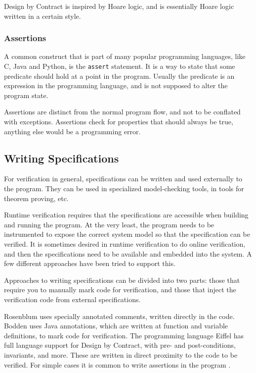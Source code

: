 \documentclass[a4paper,11pt]{kth-mag}
\begin{document}
Design by Contract is inspired by Hoare logic, and is essentially Hoare logic
written in a certain style.


\subsubsection{Assertions}

A common construct that is part of many popular programming languages, like C,
Java and Python, is the \texttt{assert} statement. It is a way to state that
some predicate should hold at a point in the program. Usually the predicate is
an expression in the programming language, and is not supposed to alter the
program state.

Assertions are distinct from the normal program flow, and not to be conflated
with exceptions. Assertions check for properties that should always be true,
anything else would be a programming error.


\subsection{Writing Specifications}

For verification in general, specifications can be written and used externally
to the program. They can be used in specialized model-checking tools, in tools
for theorem proving, etc.

Runtime verification requires that the specifications are accessible when
building and running the program. At the very least, the program needs to be
instrumented to expose the correct system model so that the specification can
be verified. It is sometimes desired in runtime verification to do online
verification, and then the specifications need to be available and embedded
into the system. A few different approaches have been tried to support this.

Approaches to writing specifications can be divided into two parts: those that
require you to manually mark code for verification, and those that inject the
verification code from external specifications.

Rosenblum \cite{rosenblum95practicalassertions} uses specially annotated
comments, written directly in the code. Bodden
\cite{bodden05efficientrv,bodden04lightweightltl} uses Java annotations, which
are written at function and variable definitions, to mark code for
verification. The programming language Eiffel has full language support for
Design by Contract, with pre- and post-conditions, invariants, and more. These
are written in direct proximity to the code to be verified. For simple cases it
is common to write assertions in the program \cite{bartetzko01jass}.
\end{document}
